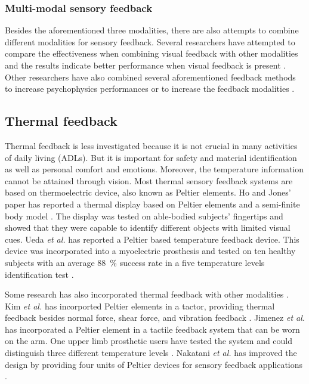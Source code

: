 \subsubsection{Multi-modal sensory feedback}
Besides the aforementioned three modalities, there are also attempts to combine different modalities for sensory feedback. 
Several researchers have attempted to compare the effectiveness when combining visual feedback with other modalities and the results indicate better performance when visual feedback is present \cite{saunders2011role, patterson1992design}. Other researchers have also combined several aforementioned feedback methods to increase psychophysics performances \cite{d2014hyve, huang2017multi} or to increase the feedback modalities \cite{jimenez2014evaluation}.


\subsection{Thermal feedback}

Thermal feedback is less investigated because it is not crucial in many activities of daily living (ADLs). But it is important for safety and material identification as well as personal comfort and emotions. Moreover, the temperature information cannot be attained through vision. Most thermal sensory feedback systems are based on thermoelectric device, also known as Peltier elements. 
Ho and Jones' paper has reported a thermal display based on Peltier elements and a semi-finite body model \cite{ho2007development}. The display was tested on able-bodied subjects' fingertips and showed that they were capable to identify different objects with limited visual cues.
Ueda \textit{et al.} has reported a Peltier based temperature feedback device. This device was incorporated into a myoelectric prosthesis and tested on ten healthy subjects with an average \SI{88}{\%} success rate in a five temperature levels identification test \cite{ueda2016development}.

Some research has also incorporated thermal feedback with other modalities \cite{nakatani2016novel, kim2008design}.
Kim \textit{et al.} has incorported Peltier elements in a tactor, providing thermal feedback besides normal force, shear force, and vibration feedback \cite{kim2008design}. 
Jimenez \textit{et al.} has incorporated a Peltier element in a tactile feedback system that can be worn on the arm. One upper limb prosthetic users have tested the system and could distinguish three different temperature levels \cite{jimenez2014evaluation}. Nakatani \textit{et al.} has improved the design by providing four units of Peltier devices for sensory feedback applications \cite{nakatani2016novel}.



